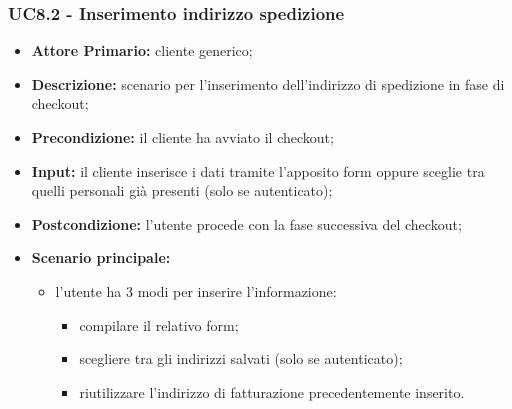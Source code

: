 \subsubsection{UC8.2 - Inserimento indirizzo spedizione}
\label{UC8.2}
\begin{itemize}
    \item \textbf{Attore Primario:} cliente generico;
    \item \textbf{Descrizione:} scenario per l'inserimento dell'indirizzo di spedizione in fase di checkout;
    \item \textbf{Precondizione:} il cliente ha avviato il checkout;
    \item \textbf{Input:} il cliente inserisce i dati tramite l'apposito form oppure sceglie tra quelli personali già presenti (solo se autenticato);
    \item \textbf{Postcondizione:} l'utente procede con la fase successiva del checkout;
    \item \textbf{Scenario principale:}
    \begin{itemize}
        \item l'utente ha 3 modi per inserire l'informazione:
        \begin{itemize}
            \item compilare il relativo form;
            \item scegliere tra gli indirizzi salvati (solo se autenticato);
            \item riutilizzare l'indirizzo di fatturazione precedentemente inserito.
        \end{itemize}
    \end{itemize}
\end{itemize}

